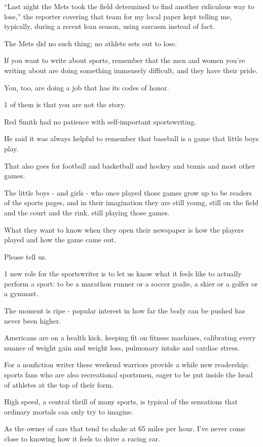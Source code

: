 \documentclass{book}
\numberwithin{equation}{section}
\begin{document}
``Last night the Mets took the field determined to find another ridiculous way to lose,'' the reporter covering that team for my local paper kept telling me, typically, during a recent lean season, using sarcasm instead of fact.

The Mets did no such thing; no athlete sets out to lose.

If you want to write about sports, remember that the men and women you're writing about are doing something immensely difficult, and they have their pride.

You, too, are doing a job that has its codes of honor.

1 of them is that you are not the story.

%
Red Smith had no patience with self-important sportswriting.

He said it was always helpful to remember that baseball is a game that little boys play.

That also goes for football and basketball and hockey and tennis and most other games.

The little boys - and girls - who once played those games grow up to be readers of the sports pages, and in their imagination they are still young, still on the field and the court and the rink, still playing those games.

What they want to know when they open their newspaper is how the players played and how the game came out.

Please tell us.

%
1 new role for the sportswriter is to let us know what it feels like to actually perform a sport: to be a marathon runner or a soccer goalie, a skier or a golfer or a gymnast.

The moment is ripe - popular interest in how far the body can be pushed has never been higher.

Americans are on a health kick, keeping fit on fitness machines, calibrating every nuance of weight gain and weight loss, pulmonary intake and cardiac stress.

For a nonfiction writer these weekend warriors provide a while new readership: sports fans who are also recreational sportsmen, eager to be put inside the head of athletes at the top of their form.

%
High speed, a central thrill of many sports, is typical of the sensations that ordinary mortals can only try to imagine.

As the owner of cars that tend to shake at 65 miles per hour, I've never come close to knowing how it feels to drive a racing car.
\end{document}
